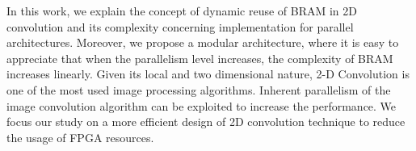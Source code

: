 \documentclass[a1paper,portrait,fontscale=0.43]{baposter}
\begin{document}
\begin{poster}
{{In this work, we explain the concept of dynamic reuse of BRAM in 2D convolution
and its complexity concerning implementation for parallel architectures. Moreover, we
propose a modular architecture, where it is easy to appreciate that when the
parallelism level increases, the complexity of BRAM increases linearly.
Given its local and two dimensional nature, 2-D Convolution is one of the most used image processing algorithms. 
Inherent parallelism of the image convolution algorithm can be exploited to increase the performance.
We focus our study on a more efficient design of 2D convolution technique
to reduce the usage of  FPGA resources.
}}


\end{poster}
\end{document}
